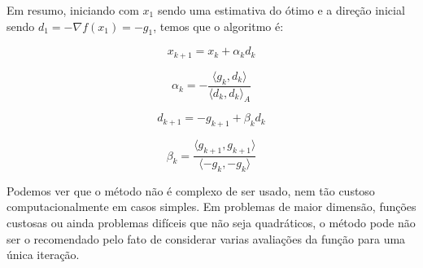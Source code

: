 Em resumo, iniciando com \(x_1\) sendo uma estimativa do ótimo e a direção inicial sendo \(d_1 = -\nabla f(x_1) = -g_1\), temos que o algoritmo é:

\begin{equation}
x_{k+1} = x_k + \alpha_k d_k
\end{equation}

\begin{equation}
\alpha_k= - \frac{\langle g_k, d_k \rangle}{\langle d_k, d_k \rangle_A}
\end{equation}

\begin{equation}
d_{k+1} = -g_{k+1} + \beta_k d_k
\end{equation}

\begin{equation}
\beta_k = \frac{\langle g_{k+1}, g_{k+1} \rangle}{\langle -g_{k}, - g_k \rangle}
\end{equation}

Podemos ver que o método não é complexo de ser usado, nem tão custoso computacionalmente em casos simples.
Em problemas de maior dimensão, funções custosas ou ainda problemas difíceis que não seja quadráticos, o
método pode não ser o recomendado pelo fato de considerar varias avaliações da função para uma única iteração.